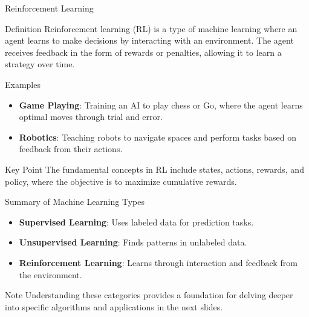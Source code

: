 \documentclass[aspectratio=169]{beamer}
\begin{document}
\begin{frame}{Reinforcement Learning}
    \begin{block}{Definition}
        Reinforcement learning (RL) is a type of machine learning where an agent learns to make decisions by interacting with an environment. The agent receives feedback in the form of rewards or penalties, allowing it to learn a strategy over time.
    \end{block}

    \begin{block}{Examples}
        \begin{itemize}
            \item \textbf{Game Playing}: Training an AI to play chess or Go, where the agent learns optimal moves through trial and error.
            \item \textbf{Robotics}: Teaching robots to navigate spaces and perform tasks based on feedback from their actions.
        \end{itemize}
    \end{block}

    \begin{block}{Key Point}
        The fundamental concepts in RL include states, actions, rewards, and policy, where the objective is to maximize cumulative rewards.
    \end{block}
\end{frame}

\begin{frame}{Summary of Machine Learning Types}
    \begin{itemize}
        \item \textbf{Supervised Learning}: Uses labeled data for prediction tasks.
        \item \textbf{Unsupervised Learning}: Finds patterns in unlabeled data.
        \item \textbf{Reinforcement Learning}: Learns through interaction and feedback from the environment.
    \end{itemize}
    \begin{block}{Note}
        Understanding these categories provides a foundation for delving deeper into specific algorithms and applications in the next slides.
    \end{block}
\end{frame}
\end{document}
